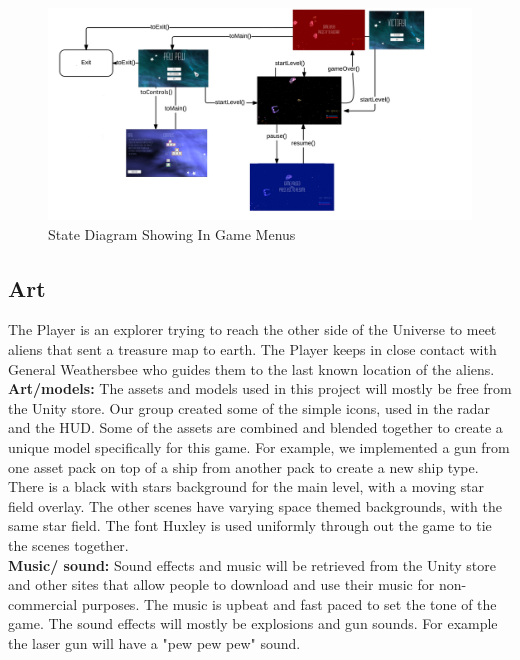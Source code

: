 \documentclass[12pt]{article}       %
\def\hs{\hspace{15pt}}
\begin{document}
\begin{figure} [H]
\centering
\includegraphics[width=6.7 in]{NewPewPewStateDiagramFinal.png}
\caption{State Diagram Showing In Game Menus} \label{PewState}
\end{figure}

\subsection{Art} %

	\hs {\bf Story:} The Player is an explorer trying to reach the other side of the Universe to meet aliens that sent a treasure map to earth. The Player keeps in close contact with General Weathersbee who guides them to the last known location of the aliens. \\

	{\bf Art/models:} The assets and models used in this project will mostly be free from the Unity store. Our group created some of the simple icons, used in the radar and the HUD. Some of the assets are combined and blended together to create a unique model specifically for this game. For example, we implemented a gun from one asset pack on top of a ship from another pack to create a new ship type. There is a black with stars background for the main level, with a moving star field overlay. The other scenes have varying space themed backgrounds, with the same star field. The font Huxley is used uniformly through out the game to tie the scenes together.  \\

	{\bf Music/ sound:} Sound effects and music will be retrieved from the Unity store and other sites that allow people to download and use their music for non-commercial purposes. The music is upbeat and fast paced to set the tone of the game. The sound effects will mostly be explosions and gun sounds. For example the laser gun will have a "pew pew pew" sound. 
\end{document}
